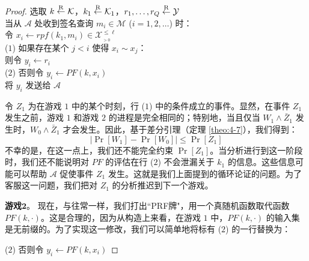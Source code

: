 \begin{proof}
\hspace*{5pt} 选取 $k\overset{\rm R}\leftarrow\mathcal{K}$，$k_1\overset{\rm R}\leftarrow\mathcal{K}_1$，$r_1,\dots,r_Q\overset{\rm R}\leftarrow\mathcal{Y}$\\
\hspace*{26pt} 当从 $\mathcal{A}$ 处收到签名查询 $m_i\in\mathcal{M}$ ($i=1,2,\dots$) 时：\\
\hspace*{50pt} 令 $x_i\leftarrow rpf(k_1,m_i)\in\mathcal{X}^{\leq\ell}_{_{>0}}$\\
\hspace*{1pt} ($1$)
\hspace*{28.5pt} 如果存在某个 $j<i$ 使得 $x_i\sim x_j$：\\
\hspace*{75pt} 则令 $y_i\leftarrow r_i$\\
\hspace*{1pt} ($2$)
\hspace*{53.5pt} 否则令 $y_i\leftarrow PF(k,x_i)$\\ %
\hspace*{50pt} 将 $y_i$ 发送给 $\mathcal{A}$

\vspace{5pt}

\noindent
令 $Z_1$ 为在游戏 $1$ 中的某个时刻，行 ($1$) 中的条件成立的事件。显然，在事件 $Z_1$ 发生之前，游戏 $1$ 和游戏 $2$ 的进程是完全相同的；特别地，当且仅当 $W_1\land\bar{Z}_1$ 发生时，$W_0\land\bar{Z}_1$ 才会发生。因此，基于差分引理（定理 \ref{theo:4-7}），我们得到：
\begin{equation}\label{eq:6-23}
\big\lvert\Pr[W_1]-\Pr[W_0]\big\rvert\leq\Pr[Z_1]
\end{equation}
不幸的是，在这一点上，我们还不能完全约束 $\Pr[Z_1]$。当分析进行到这一阶段时，我们还不能说明对 $PF$ 的评估在行 ($2$) 不会泄漏关于 $k_1$ 的信息。这些信息可能可以帮助 $\mathcal{A}$ 促使事件 $Z_1$ 发生。这就是我们上面提到的循环论证的问题。为了客服这一问题，我们把对 $Z_1$ 的分析推迟到下一个游戏。

\vspace{5pt}

\noindent\textbf{游戏$\mathbf{2}$}。
现在，与往常一样，我们打出``PRF牌"，用一个真随机函数取代函数 $PF(k,\cdot)$。这是合理的，因为从构造上来看，在游戏 $1$ 中，$PF(k,\cdot)$ 的输入集是无前缀的。为了实现这一修改，我们可以简单地将标有 ($2$) 的一行替换为：

\vspace{5pt}

\hspace*{-19pt} ($2$)
\hspace*{53.5pt} 否则令 $y_i\leftarrow PF(k,x_i)$


\end{proof}
